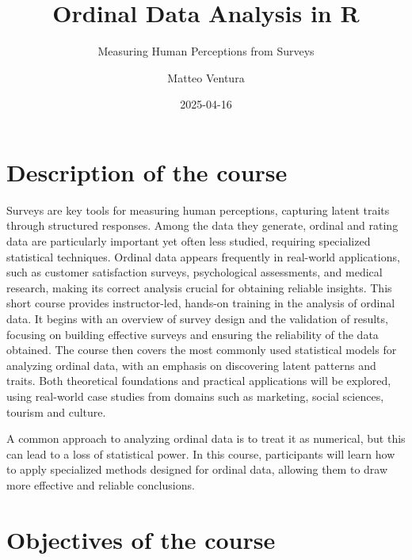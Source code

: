 \documentclass[
]{article}
\title{Ordinal Data Analysis in R}
\subtitle{Measuring Human Perceptions from Surveys}
\author{Matteo Ventura}
\date{2025-04-16}
\renewcommand*\contentsname{Table of contents}
\newcommand\contentsname{Table of contents}
\begin{document}
\maketitle
\ifdefined\Shaded\renewenvironment{Shaded}{\begin{tcolorbox}[sharp corners, enhanced, frame hidden, borderline west={3pt}{0pt}{shadecolor}, interior hidden, breakable, boxrule=0pt]}{\end{tcolorbox}}\fi

\renewcommand*\contentsname{Table of contents}
{
\hypersetup{linkcolor=}
\setcounter{tocdepth}{3}
\tableofcontents
}
\hypertarget{description-of-the-course}{%
\section*{Description of the course}\label{description-of-the-course}}

Surveys are key tools for measuring human perceptions, capturing latent
traits through structured responses. Among the data they generate,
ordinal and rating data are particularly important yet often less
studied, requiring specialized statistical techniques. Ordinal data
appears frequently in real-world applications, such as customer
satisfaction surveys, psychological assessments, and medical research,
making its correct analysis crucial for obtaining reliable insights.
This short course provides instructor-led, hands-on training in the
analysis of ordinal data. It begins with an overview of survey design
and the validation of results, focusing on building effective surveys
and ensuring the reliability of the data obtained. The course then
covers the most commonly used statistical models for analyzing ordinal
data, with an emphasis on discovering latent patterns and traits. Both
theoretical foundations and practical applications will be explored,
using real-world case studies from domains such as marketing, social
sciences, tourism and culture.

A common approach to analyzing ordinal data is to treat it as numerical,
but this can lead to a loss of statistical power. In this course,
participants will learn how to apply specialized methods designed for
ordinal data, allowing them to draw more effective and reliable
conclusions.

\hypertarget{objectives-of-the-course}{%
\section*{Objectives of the course}\label{objectives-of-the-course}}
\end{document}
